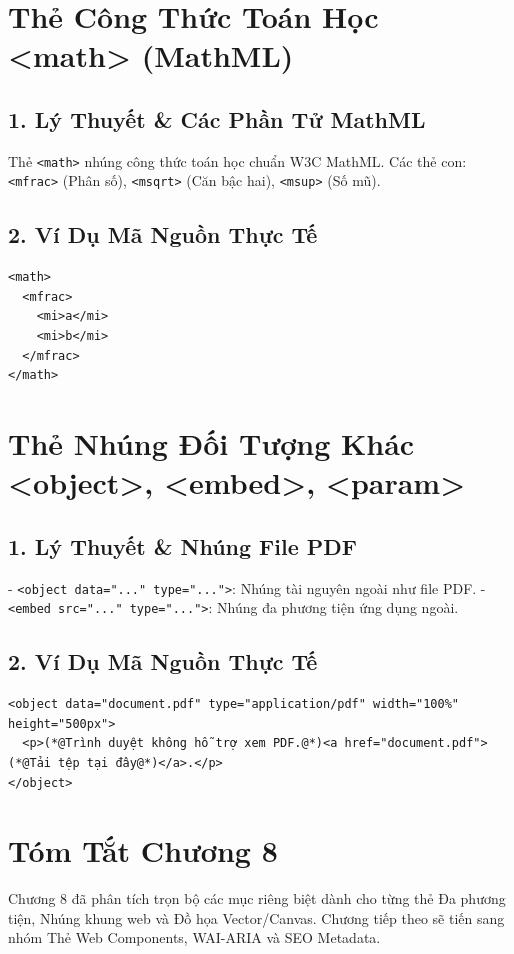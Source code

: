 \documentclass[11pt,oneside]{book}
\newcommand{\codeinline}[1]{\textcolor{accentOrange}{\texttt{#1}}}
\begin{document}
\section{Thẻ Công Thức Toán Học <math> (MathML)}
\subsection{1. Lý Thuyết \& Các Phần Tử MathML}
Thẻ \codeinline{<math>} nhúng công thức toán học chuẩn W3C MathML. Các thẻ con: \codeinline{<mfrac>} (Phân số), \codeinline{<msqrt>} (Căn bậc hai), \codeinline{<msup>} (Số mũ).

\subsection{2. Ví Dụ Mã Nguồn Thực Tế}
\begin{lstlisting}[language=HTML5, caption={Ví dụ hiển thị công thức toán học Phân số}]
<math>
  <mfrac>
    <mi>a</mi>
    <mi>b</mi>
  </mfrac>
</math>
\end{lstlisting}

\section{Thẻ Nhúng Đối Tượng Khác <object>, <embed>, <param>}
\subsection{1. Lý Thuyết \& Nhúng File PDF}
- \codeinline{<object data="..." type="...">}: Nhúng tài nguyên ngoài như file PDF.
- \codeinline{<embed src="..." type="...">}: Nhúng đa phương tiện ứng dụng ngoài.

\subsection{2. Ví Dụ Mã Nguồn Thực Tế}
\begin{lstlisting}[language=HTML5, caption={Ví dụ nhúng tệp PDF hiển thị trực tiếp}]
<object data="document.pdf" type="application/pdf" width="100%" height="500px">
  <p>(*@Trình duyệt không hỗ trợ xem PDF.@*)<a href="document.pdf">(*@Tải tệp tại đây@*)</a>.</p>
</object>
\end{lstlisting}

\section{Tóm Tắt Chương 8}
Chương 8 đã phân tích trọn bộ các mục riêng biệt dành cho từng thẻ Đa phương tiện, Nhúng khung web và Đồ họa Vector/Canvas. Chương tiếp theo sẽ tiến sang nhóm Thẻ Web Components, WAI-ARIA và SEO Metadata.
\end{document}
